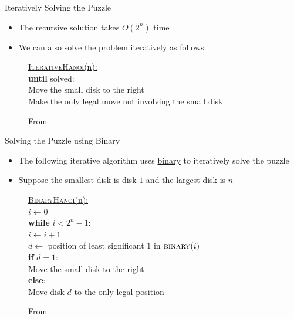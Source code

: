 \documentclass[aspectratio=169]{beamer}
\begin{document}
\begin{frame}{Iteratively Solving the Puzzle}
    \begin{itemize}
        \item The recursive solution takes $O\left( 2^n \right)$ time
        \item We can also solve the problem iteratively as follows
    \end{itemize}
    \begin{figure}
        \begin{nalgo}
            \underline{\textsc{IterativeHanoi}(n):}\+
        \\\label{}      \textbf{until} solved:\+
        \\\label{}          Move the small disk to the right
        \\\label{}          Make the only legal move not involving the small disk
        \end{nalgo}
        \caption{From \cite{sedgewick2003algorithms}}
    \end{figure}
\end{frame}

\begin{frame}{Solving the Puzzle using Binary}
    \begin{itemize}
        \item The following iterative algorithm uses \underline{binary} to iteratively solve the puzzle
        \item Suppose the smallest disk is disk $1$ and the largest disk is $n$
    \end{itemize}
    \begin{figure}
        \begin{nalgo}
            \underline{\textsc{BinaryHanoi}(n):}\+
        \\      $i \gets 0$
        \\      \textbf{while} $i < 2^n - 1$:\+
        \\          $i \gets i + 1$
        \\          $d \gets$ position of least significant $1$ in $\textsc{binary}(i)$
        \\          \textbf{if} $d = 1$:\+
        \\              Move the small disk to the right\-
        \\          \textbf{else}:\+
        \\              Move disk $d$ to the only legal position
        \end{nalgo}
        \caption{From \cite{3b1b_hanoi}}
    \end{figure}
\end{frame}
\end{document}
